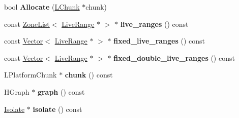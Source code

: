 \begin{DoxyCompactItemize}
\item 
\hypertarget{classv8_1_1internal_1_1_b_a_s_e___e_m_b_e_d_d_e_d_ade894e1c464fff491bb883da52069ca4}{}bool {\bfseries Allocate} (\hyperlink{classv8_1_1internal_1_1_l_chunk}{L\+Chunk} $\ast$chunk)\label{classv8_1_1internal_1_1_b_a_s_e___e_m_b_e_d_d_e_d_ade894e1c464fff491bb883da52069ca4}

\item 
\hypertarget{classv8_1_1internal_1_1_b_a_s_e___e_m_b_e_d_d_e_d_af975ec4d874d105dfad57d4833929e5f}{}const \hyperlink{classv8_1_1internal_1_1_zone_list}{Zone\+List}$<$ \hyperlink{classv8_1_1internal_1_1_live_range}{Live\+Range} $\ast$ $>$ $\ast$ {\bfseries live\+\_\+ranges} () const \label{classv8_1_1internal_1_1_b_a_s_e___e_m_b_e_d_d_e_d_af975ec4d874d105dfad57d4833929e5f}

\item 
\hypertarget{classv8_1_1internal_1_1_b_a_s_e___e_m_b_e_d_d_e_d_a93ea2d75fcc8dec5687e6f4282085c57}{}const \hyperlink{classv8_1_1internal_1_1_vector}{Vector}$<$ \hyperlink{classv8_1_1internal_1_1_live_range}{Live\+Range} $\ast$ $>$ $\ast$ {\bfseries fixed\+\_\+live\+\_\+ranges} () const \label{classv8_1_1internal_1_1_b_a_s_e___e_m_b_e_d_d_e_d_a93ea2d75fcc8dec5687e6f4282085c57}

\item 
\hypertarget{classv8_1_1internal_1_1_b_a_s_e___e_m_b_e_d_d_e_d_abe811cf54b7b58f6f9466f7e698bfeb1}{}const \hyperlink{classv8_1_1internal_1_1_vector}{Vector}$<$ \hyperlink{classv8_1_1internal_1_1_live_range}{Live\+Range} $\ast$ $>$ $\ast$ {\bfseries fixed\+\_\+double\+\_\+live\+\_\+ranges} () const \label{classv8_1_1internal_1_1_b_a_s_e___e_m_b_e_d_d_e_d_abe811cf54b7b58f6f9466f7e698bfeb1}

\item 
\hypertarget{classv8_1_1internal_1_1_b_a_s_e___e_m_b_e_d_d_e_d_a488d2db75f9c82308f9034b79b4f950a}{}L\+Platform\+Chunk $\ast$ {\bfseries chunk} () const \label{classv8_1_1internal_1_1_b_a_s_e___e_m_b_e_d_d_e_d_a488d2db75f9c82308f9034b79b4f950a}

\item 
\hypertarget{classv8_1_1internal_1_1_b_a_s_e___e_m_b_e_d_d_e_d_a586a8eaff2221ab14e3b55d7c67cb96f}{}H\+Graph $\ast$ {\bfseries graph} () const \label{classv8_1_1internal_1_1_b_a_s_e___e_m_b_e_d_d_e_d_a586a8eaff2221ab14e3b55d7c67cb96f}

\item 
\hypertarget{classv8_1_1internal_1_1_b_a_s_e___e_m_b_e_d_d_e_d_aafca7727b44748c75ff39a90282dfb8d}{}\hyperlink{classv8_1_1internal_1_1_isolate}{Isolate} $\ast$ {\bfseries isolate} () const \label{classv8_1_1internal_1_1_b_a_s_e___e_m_b_e_d_d_e_d_aafca7727b44748c75ff39a90282dfb8d}


\end{DoxyCompactItemize}
